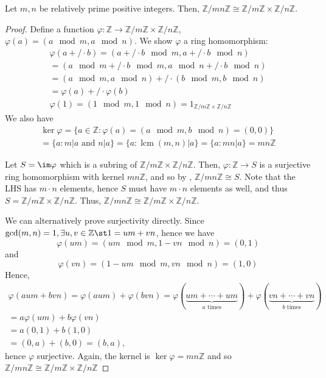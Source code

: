 \documentclass[12pt,oneside]{article}
\DeclareMathOperator*{\lcm}{lcm}
\begin{document}
\begin{theorem}\label{thm:chineseremaindertheorem}
  Let $m,n$ be relatively prime positive integers. Then, $\mathbb{Z}/mn\mathbb{Z} \cong \mathbb{Z}/m \mathbb{Z} \times \mathbb{Z}/n \mathbb{Z}$.
\end{theorem}

\begin{proof}
Define a function $\varphi : \mathbb{Z} \to \mathbb{Z}/m\mathbb{Z} \times \mathbb{Z}/n\mathbb{Z}$, $\varphi(a) = (a \mod m, a \mod n)$. We show $\varphi$ a ring homomorphism:
\begin{align*}
\varphi(a +/\cdot b) = (a+/\cdot b \mod m, a + /\cdot b \mod n) \\
= (a \mod m + /\cdot b \mod m, a \mod n + /\cdot b \mod n)   \\
= (a \mod m, a \mod n) +/\cdot (b \mod m, b \mod n)\\
= \varphi(a) +/\cdot \varphi(b)\\
\varphi(1) = (1 \mod m, 1 \mod n) = 1_{\mathbb{Z}/m\mathbb{Z} \times \mathbb{Z}/n \mathbb{Z}}
\end{align*}
We also have \begin{align*}
\ker \varphi  = \{a  \in \mathbb{Z} : \varphi(a) = (a \mod m, b \mod n) = (0,0)\} \\
= \{a : m | a \text{ and } n| a\} = \{a : \lcm (m,n) | a\} = \{a : mn | a\} = mn\mathbb{Z}
\end{align*}

Let $S = \im \varphi$ which is a subring of $\mathbb{Z}/m \mathbb{Z} \times \mathbb{Z}/n \mathbb{Z}$. Then, $\varphi :\mathbb{Z} \to S$ is a surjective ring homomorphism with kernel $mn \mathbb{Z}$, and so by , $\mathbb{Z}/mn \mathbb{Z} \cong S$. Note that the LHS has $m \cdot n$ elements, hence $S$ must have $m \cdot n$ elements as well, and thus $S = \mathbb{Z} /m \mathbb{Z} \times \mathbb{Z}/n \mathbb{Z}$. Thus, $\mathbb{Z}/mn \mathbb{Z} \cong \mathbb{Z}/m\mathbb{Z} \times \mathbb{Z}/n\mathbb{Z}$.

We can alternatively prove surjectivity directly. Since $\gcd(m,n) = 1, \exists u,v \in \mathbb{Z} \st 1 = um + vn$, hence we have \[
\varphi(um) = (um \mod m, 1 - vn \mod n) = (0, 1)
\]
and
\[ 
  \varphi(vn) = (1 - um \mod m, vn \mod n) = (1,0)
\]
Hence, \begin{align*}
\varphi(aum + bvn) = \varphi(aum) + \varphi(bvn) = \varphi(\underbrace{um + \cdots +um}_{a \text{ times}}) +  \varphi(\underbrace{vn + \cdots +vn}_{b \text{ times}})\\
= a \varphi(um) + b \varphi(vn)\\
= a (0,1) + b(1,0)\\
= (0, a) + (b,0) = (b, a),
\end{align*}
hence $\varphi$ surjective. Again, the kernel is $\ker \varphi = mn \mathbb{Z}$ and so $\mathbb{Z}/mn\mathbb{Z} \cong \mathbb{Z}/m\mathbb{Z} \times \mathbb{Z}/n\mathbb{Z}$
\end{proof}
\end{document}
